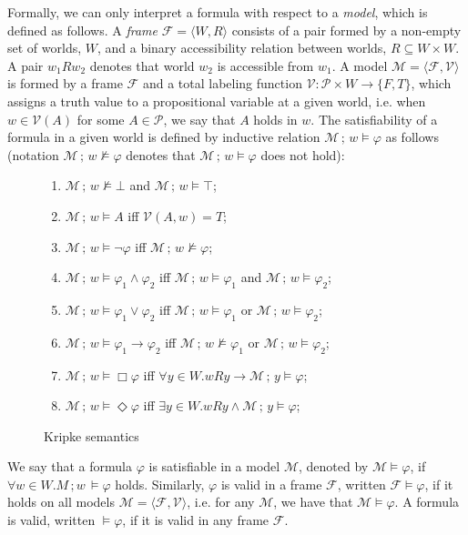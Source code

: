 \documentclass[sigconf]{acmart}
\begin{document}
Formally, we can only interpret a formula with respect to a \emph{model}, which is
defined as follows.
A \emph{frame} $\mathcal{F} = \langle W, R \rangle$ consists of a pair formed by
a non-empty set of worlds, $W$, and a binary accessibility relation between
worlds, $R \subseteq W \times W$. A pair $w_1Rw_2$ denotes that world $w_2$ is
accessible from $w_1$. A model $\mathcal{M} = \langle \mathcal{F}, \mathcal{V} \rangle$
is formed by a frame $\mathcal{F}$ and a total labeling function
$\mathcal{V} : \mathcal{P}\times W\to \{F,T\}$, which assigns
a truth value to a propositional variable at a given world, i.e. when $w \in \mathcal{V}(A)$
for some $A \in\mathcal{P}$, we say that $A$ holds in $w$. The satisfiability of a formula
in a given world is defined by inductive relation $\mathcal{M}\,;\,w\models \varphi$ as
follows (notation $\mathcal{M}\,;\,w\not\models \varphi$ denotes
that $\mathcal{M}\,;\,w\models \varphi$ does not hold):

\begin{figure}[H]
\begin{enumerate}
  \item $\mathcal{M}\,;\,w\not\models \bot$ and $\mathcal{M}\,;\,w\models \top$;
  \item $\mathcal{M}\,;\,w\models A$ iff $\mathcal{V}(A,w) = T$;
  \item $\mathcal{M}\,;\,w\models \neg\varphi$ iff $\mathcal{M}\,;\,w\not\models\varphi$;
  \item $\mathcal{M}\,;\,w\models \varphi_1 \land \varphi_2$ iff
    $\mathcal{M}\,;\,w\models\varphi_1$ and $\mathcal{M}\,;\,w\models\varphi_2$;
  \item $\mathcal{M}\,;\,w\models \varphi_1 \lor \varphi_2$ iff
    $\mathcal{M}\,;\,w\models\varphi_1$ or $\mathcal{M}\,;\,w\models\varphi_2$;
  \item $\mathcal{M}\,;\,w\models \varphi_1 \to \varphi_2$ iff
    $\mathcal{M}\,;\,w\not\models\varphi_1$ or $\mathcal{M}\,;\,w\models\varphi_2$;
  \item $\mathcal{M}\,;\,w\models\Box\varphi$ iff $\forall y \in W. w R y \to \mathcal{M}\,;\,y \models\varphi$;
  \item $\mathcal{M}\,;\,w\models\Diamond\varphi$ iff $\exists y \in W. w R y \land \mathcal{M}\,;\,y \models\varphi$;
  \end{enumerate}
  \caption{Kripke semantics}
  \label{fig:kripke}
\end{figure}
We say that a formula $\varphi$ is satisfiable in a model $\mathcal{M}$,
denoted by $\mathcal{M}\models \varphi$, if $\forall w \in W. M\,;w\,\models \varphi$ holds.
Similarly, $\varphi$ is valid in a frame $\mathcal{F}$, written $\mathcal{F}\models\varphi$, if
it holds on all models $\mathcal{M} = \langle \mathcal{F},\mathcal{V}\rangle$, i.e.
for any $\mathcal{M}$, we have that $\mathcal{M}\models\varphi$. A formula
is valid, written $\models \varphi$, if it is valid in any frame $\mathcal{F}$.
\end{document}
